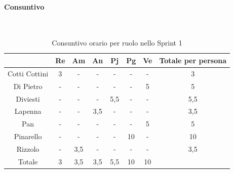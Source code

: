 \documentclass{article}
\begin{document}
                \paragraph{Consuntivo}\mbox{}\\
                \begin{table}[H]
                    \centering
                    \begin{tabular}{|c|c|c|c|c|c|c|c|}
                    \hline
                                    & Re  & Am  & An  & Pj  & Pg  & Ve  & Totale per persona \\ \hline
                    Cotti Cottini & 3   & -   & -   & -   & -   & -   & 3                  \\ \hline
                    Di Pietro     & -   & -   & -   & -   & -   & 5   & 5                  \\ \hline
                    Diviesti      & -   & -   & -   & 5,5 & -   & -   & 5,5                \\ \hline
                    Lapenna       & -   & -   & 3,5 & -   & -   & -   & 3,5                \\ \hline
                    Pan           & -   & -   & -   & -   & -   & 5   & 5                  \\ \hline
                    Pinarello     & -   & -   & -   & -   & 10  & -   & 10                 \\ \hline
                    Rizzolo       & -   & 3,5 & -   & -   & -   & -   & 3,5                \\ \hline
                    Totale        & 3   & 3,5 & 3,5 & 5,5 & 10  & 10  &                    \\ \hline
                    \end{tabular}
                    \caption{Consuntivo orario per ruolo nello Sprint 1}
                \end{table}

\end{document}

